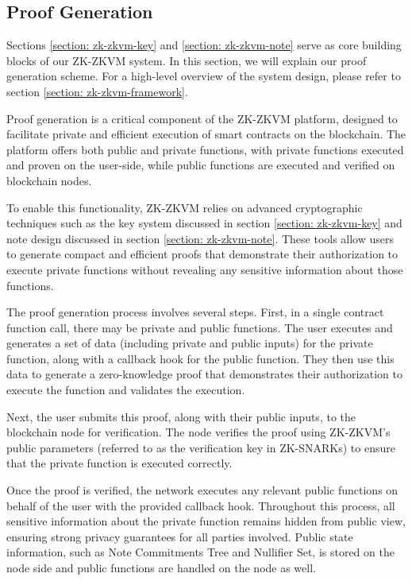 \subsection{Proof Generation}\label{section: zk-zkvm-user-end-prove}

Sections \ref{section: zk-zkvm-key} and \ref{section: zk-zkvm-note} serve as core building blocks of our ZK-ZKVM system. In this section, we will explain our proof generation scheme. For a high-level overview of the system design, please refer to section \ref{section: zk-zkvm-framework}.

Proof generation is a critical component of the ZK-ZKVM platform, designed to facilitate private and efficient execution of smart contracts on the blockchain. The platform offers both public and private functions, with private functions executed and proven on the user-side, while public functions are executed and verified on blockchain nodes.

To enable this functionality, ZK-ZKVM relies on advanced cryptographic techniques such as the key system discussed in section \ref{section: zk-zkvm-key} and note design discussed in section \ref{section: zk-zkvm-note}. These tools allow users to generate compact and efficient proofs that demonstrate their authorization to execute private functions without revealing any sensitive information about those functions.

The proof generation process involves several steps. First, in a single contract function call, there may be private and public functions. The user executes and generates a set of data (including private and public inputs) for the private function, along with a callback hook for the public function. They then use this data to generate a zero-knowledge proof that demonstrates their authorization to execute the function and validates the execution.

Next, the user submits this proof, along with their public inputs, to the blockchain node for verification. The node verifies the proof using ZK-ZKVM's public parameters (referred to as the verification key in ZK-SNARKs) to ensure that the private function is executed correctly.

Once the proof is verified, the network executes any relevant public functions on behalf of the user with the provided callback hook. Throughout this process, all sensitive information about the private function remains hidden from public view, ensuring strong privacy guarantees for all parties involved. Public state information, such as Note Commitments Tree and Nullifier Set, is stored on the node side and public functions are handled on the node as well.


